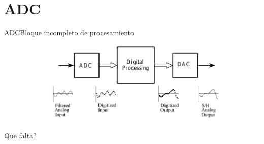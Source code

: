  \section{ADC}
 \begin{frame}{ADC}{Bloque incompleto de procesamiento}
    \center\includegraphics[width=1\textwidth]{1_clase/adc_dac1}
    \begin{alertblock} {Que falta?}
    \end{alertblock}
    \vfill
 \end{frame}
